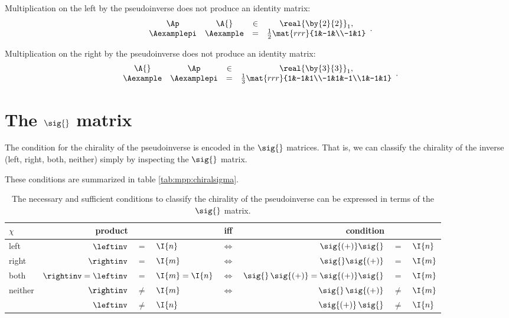 Multiplication on the left by the pseudoinverse does not produce an identity matrix:
\begin{equation*}
  \begin{array}{cccc}
  \Ap&\A{}&\in&\real{\by{2}{2}}_{1},\\
  \Aexamplepi &
  \Aexample 
   & = &
  \frac{1}{2}
  \mat{rrr}{1&-1&\\-1&1}
  \end{array}.
\end{equation*}

%
Multiplication on the right by the pseudoinverse does not produce an identity matrix:
\begin{equation*}
  \begin{array}{cccc}
  \A{}&\Ap&\in&\real{\by{3}{3}}_{1},\\
  \Aexample &
  \Aexamplepi
   & = &
  \frac{1}{3}
  \mat{rrr}{1&-1&1\\-1&1&-1\\1&-1&1}
  \end{array}.
\end{equation*}

\section{The $\sig{}$ matrix}
The condition for the chirality of the pseudoinverse is encoded in the $\sig{}$ matrices. That is, we can classify the chirality of the inverse (left, right, both, neither) simply by inspecting the $\sig{}$ matrix. 

These conditions are summarized in table \eqref{tab:mpp:chiralsigma}.
\begin{table}[htdp]
\begin{center}
%
\begin{tabular}{l|rclcrcl}
    $\chi$  & product  && & iff & condition \\\hline
    left  & $\leftinv$  &$=$& $\I{n}$ & $\iff$ & $\sig{(+)}\sig{}$ &=& $\I{n}$\\
    right & $\rightinv$ &$=$& $\I{m}$ & $\iff$ & $\sig{}\sig{(+)}$ &=& $\I{m}$\\
    both  & $\rightinv = \leftinv$ &$=$& $\I{m}=\I{n}$ & $\iff$ & $\sig{}\,\sig{(+)}=\sig{(+)}\sig{}$ &=& $\I{m}$\\
    neither  & $\rightinv $ &$\ne$& $\I{m}$ & $\iff$ & $\sig{}\,\sig{(+)}$ &$\ne$& $\I{m}$\\
             & $\leftinv $  &$\ne$& $\I{n}$ &        & $\sig{(+)}\,\sig{}$ &$\ne$& $\I{n}$\\[5pt]
\end{tabular}
%
\end{center}
\label{tab:mpp:chiralsigma}
\caption[Necessary and sufficient conditions to classify the chirality of the pseudoinverse]{The necessary and sufficient conditions to classify the chirality of the pseudoinverse can be expressed in terms of the $\sig{}$ matrix.}
\end{table}%

